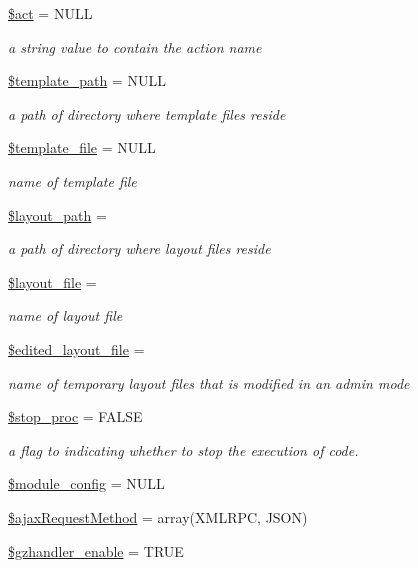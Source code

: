 \begin{DoxyCompactItemize}
\hyperlink{classModuleObject_a9d43905d072c53cd5cd239d706215895}{\$act} = N\+U\+L\+L
\begin{DoxyCompactList}\small\item\em a string value to contain the action name \end{DoxyCompactList}\item 
\hyperlink{classModuleObject_a8a632bae853adef8e2ab9596a3a86661}{\$template\+\_\+path} = N\+U\+L\+L
\begin{DoxyCompactList}\small\item\em a path of directory where template files reside \end{DoxyCompactList}\item 
\hyperlink{classModuleObject_a6eddf08e627527affc7e835a6d302733}{\$template\+\_\+file} = N\+U\+L\+L
\begin{DoxyCompactList}\small\item\em name of template file \end{DoxyCompactList}\item 
\hyperlink{classModuleObject_ada660958e777413d332337fba67d657f}{\$layout\+\_\+path} = \textquotesingle{}\textquotesingle{}
\begin{DoxyCompactList}\small\item\em a path of directory where layout files reside \end{DoxyCompactList}\item 
\hyperlink{classModuleObject_a2a1677b06eb7b3ff04ff19e960a64e08}{\$layout\+\_\+file} = \textquotesingle{}\textquotesingle{}
\begin{DoxyCompactList}\small\item\em name of layout file \end{DoxyCompactList}\item 
\hyperlink{classModuleObject_a1fcbb01c627ce5ff104c05f54715bd61}{\$edited\+\_\+layout\+\_\+file} = \textquotesingle{}\textquotesingle{}
\begin{DoxyCompactList}\small\item\em name of temporary layout files that is modified in an admin mode \end{DoxyCompactList}\item 
\hyperlink{classModuleObject_ad4efa1b4c623247763e4d56f76c5fb1c}{\$stop\+\_\+proc} = F\+A\+L\+S\+E
\begin{DoxyCompactList}\small\item\em a flag to indicating whether to stop the execution of code. \end{DoxyCompactList}\item 
\hyperlink{classModuleObject_aed2cac16f365c2b463772e3eeb0c1402}{\$module\+\_\+config} = N\+U\+L\+L
\item 
\hyperlink{classModuleObject_a783d38cb68310dc6e5a1f6c1cc6c6b84}{\$ajax\+Request\+Method} = array(\textquotesingle{}X\+M\+L\+R\+P\+C\textquotesingle{}, \textquotesingle{}J\+S\+O\+N\textquotesingle{})
\item 
\hyperlink{classModuleObject_acda88247a161a0ddf878e8f504909329}{\$gzhandler\+\_\+enable} = T\+R\+U\+E
\end{DoxyCompactItemize}


